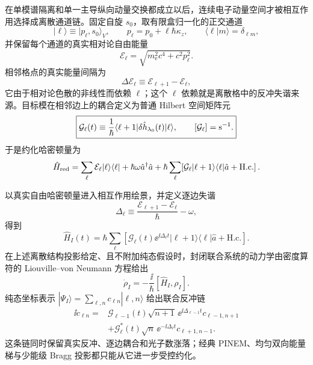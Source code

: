 在单模谱隔离和单一主导纵向动量交换都成立以后，连续电子动量空间才被相互作用选择成离散通道链。固定自旋 $s_0$，取有限盒归一化的正交通道
\begin{equation*}
|\ell\rangle\equiv|p_\ell,s_0\rangle_V,
\qquad
p_\ell=p_0+\ell\hbar \kappa_z,
\qquad
\langle\ell|m\rangle=\delta_{\ell m},
\end{equation*}
并保留每个通道的真实相对论自由能量
\begin{equation*}
\boxed{\mathcal E_\ell=\sqrt{m_{\mathrm e}^2c^4+c^2p_\ell^2}.}
\end{equation*}
相邻格点的真实能量间隔为
\[
 \Delta\mathcal E_\ell
 \equiv\mathcal E_{\ell+1}-\mathcal E_\ell,
\]
它由于相对论色散的非线性而依赖 $\ell$；这个 $\ell$ 依赖就是离散格中的反冲失谐来源。目标模在相邻边上的耦合定义为普通 Hilbert 空间矩阵元
\begin{equation}
\boxed{
\mathcal G_\ell(t)
\equiv\frac1\hbar\langle\ell+1|\delta\hat h_{\lambda_0}(t)|\ell\rangle,
\qquad [\mathcal G_\ell]={\rm s^{-1}}.}
\label{eq:normalized_discrete_channel_coupling}
\end{equation}
于是约化哈密顿量为
\begin{equation*}
\hat H_{\rm red}
=\sum_\ell\mathcal E_\ell|\ell\rangle\langle\ell|
+\hbar\omega\hat a^\dagger\hat a
+\hbar\sum_\ell\!
\left[\mathcal G_\ell|\ell+1\rangle\langle\ell|\hat a+\mathrm{H.c.}\right].
\end{equation*}

以真实自由哈密顿量进入相互作用绘景，并定义逐边失谐
\begin{equation*}
\boxed{
\Delta_\ell
\equiv\frac{\mathcal E_{\ell+1}-\mathcal E_\ell}{\hbar}-\omega,}
\end{equation*}
得到
\begin{equation*}
\hat H_I(t)=\hbar\sum_\ell
\left[
\mathcal G_\ell(t)\ee^{\ii\Delta_\ell t}|\ell+1\rangle\langle\ell|\hat a
+\mathrm{H.c.}
\right].
\end{equation*}
在上述离散结构投影给定、且不附加纯态假设时，封闭联合系统的动力学由密度算符的 Liouville--von Neumann 方程给出
\begin{equation}
\boxed{
\dot\rho_I=-\frac{\ii}{\hbar}[\hat H_I,\rho_I].}
\label{eq:unified_density_mother}
\end{equation}
纯态坐标表示 $|\Psi_I\rangle=\sum_{\ell,n}c_{\ell n}|\ell,n\rangle$ 给出联合反冲链
\begin{equation}
\boxed{
\begin{aligned}
\ii\dot c_{\ell n}
={}&\mathcal G_{\ell-1}(t)\sqrt{n+1}\,
\ee^{\ii\Delta_{\ell-1}t}c_{\ell-1,n+1}\\
&+\mathcal G_\ell^*(t)\sqrt n\,
\ee^{-\ii\Delta_\ell t}c_{\ell+1,n-1}.
\end{aligned}}
\label{eq:unified_joint_amplitude_chain}
\end{equation}
这条链同时保留真实反冲、逐边耦合和光子数涨落；经典 PINEM、均匀双向能量梯与少能级 Bragg 投影都只能从它进一步受控约化。

